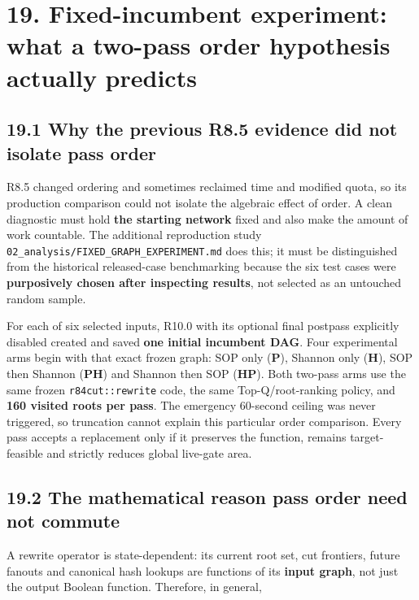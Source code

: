 \documentclass[a4paper,10pt]{article}
\theoremstyle{definition}
\theoremstyle{remark}
\begin{document}
\section{19. Fixed-incumbent experiment: what a two-pass order hypothesis actually predicts}\label{fixed-incumbent-experiment-what-a-two-pass-order-hypothesis-actually-predicts}

\subsection{19.1 Why the previous R8.5 evidence did not isolate pass order}\label{why-the-previous-r8.5-evidence-did-not-isolate-pass-order}

R8.5 changed ordering and sometimes reclaimed time and modified quota, so its production comparison could not isolate the algebraic effect of order. A clean diagnostic must hold \textbf{the starting network} fixed and also make the amount of work countable. The additional reproduction study \texttt{02\_analysis/FIXED\_GRAPH\_EXPERIMENT.md} does this; it must be distinguished from the historical released-case benchmarking because the six test cases were \textbf{purposively chosen after inspecting results}, not selected as an untouched random sample.

For each of six selected inputs, R10.0 with its optional final postpass explicitly disabled created and saved \textbf{one initial incumbent DAG}. Four experimental arms begin with that exact frozen graph: SOP only (\textbf{P}), Shannon only (\textbf{H}), SOP then Shannon (\textbf{PH}) and Shannon then SOP (\textbf{HP}). Both two-pass arms use the same frozen \texttt{r84cut::rewrite} code, the same Top-Q/root-ranking policy, and \textbf{160 visited roots per pass}. The emergency 60-second ceiling was never triggered, so truncation cannot explain this particular order comparison. Every pass accepts a replacement only if it preserves the function, remains target-feasible and strictly reduces global live-gate area.

\subsection{19.2 The mathematical reason pass order need not commute}\label{the-mathematical-reason-pass-order-need-not-commute}

A rewrite operator is state-dependent: its current root set, cut frontiers, future fanouts and canonical hash lookups are functions of its \textbf{input graph}, not just the output Boolean function. Therefore, in general,
\end{document}

